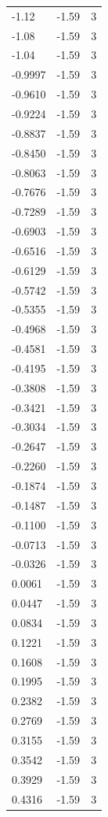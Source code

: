 \begin{longtable}{lrr}
  -1.12 & -1.59 & 3 \\
  -1.08 & -1.59 & 3 \\
  -1.04 & -1.59 & 3 \\
  -0.9997 & -1.59 & 3 \\
  -0.9610 & -1.59 & 3 \\
  -0.9224 & -1.59 & 3 \\
  -0.8837 & -1.59 & 3 \\
  -0.8450 & -1.59 & 3 \\
  -0.8063 & -1.59 & 3 \\
  -0.7676 & -1.59 & 3 \\
  -0.7289 & -1.59 & 3 \\
  -0.6903 & -1.59 & 3 \\
  -0.6516 & -1.59 & 3 \\
  -0.6129 & -1.59 & 3 \\
  -0.5742 & -1.59 & 3 \\
  -0.5355 & -1.59 & 3 \\
  -0.4968 & -1.59 & 3 \\
  -0.4581 & -1.59 & 3 \\
  -0.4195 & -1.59 & 3 \\
  -0.3808 & -1.59 & 3 \\
  -0.3421 & -1.59 & 3 \\
  -0.3034 & -1.59 & 3 \\
  -0.2647 & -1.59 & 3 \\
  -0.2260 & -1.59 & 3 \\
  -0.1874 & -1.59 & 3 \\
  -0.1487 & -1.59 & 3 \\
  -0.1100 & -1.59 & 3 \\
  -0.0713 & -1.59 & 3 \\
  -0.0326 & -1.59 & 3 \\
  0.0061 & -1.59 & 3 \\
  0.0447 & -1.59 & 3 \\
  0.0834 & -1.59 & 3 \\
  0.1221 & -1.59 & 3 \\
  0.1608 & -1.59 & 3 \\
  0.1995 & -1.59 & 3 \\
  0.2382 & -1.59 & 3 \\
  0.2769 & -1.59 & 3 \\
  0.3155 & -1.59 & 3 \\
  0.3542 & -1.59 & 3 \\
  0.3929 & -1.59 & 3 \\
  0.4316 & -1.59 & 3 \\

\end{longtable}
